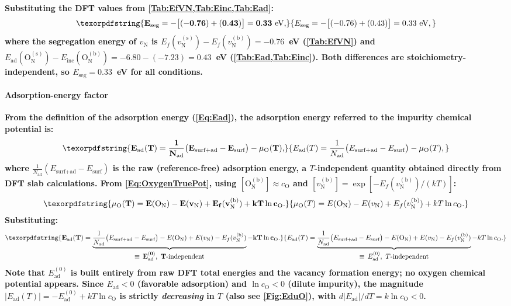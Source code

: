 \documentclass[preprint,12pt,sort&compress]{elsarticle}
\newcommand{\?}{\stackrel{?}{=}}
\providecommand{\DIFaddtex}[1]{{\bf #1}} %
\providecommand{\DIFadd}[1]{\texorpdfstring{\DIFaddtex{#1}}{#1}} %
\begin{document}

\DIFadd{Substituting the DFT values from \cref{Tab:EfVN,Tab:Einc,Tab:Ead}:
}\begin{equation}
\DIFadd{E_\text{seg} = -\bigl[(-0.76) + (0.43)\bigr] = 0.33~\text{eV},
\label{Eq:App:EsegValue}
}\end{equation}
\DIFadd{where the segregation energy of $v_\text{N}$ is $E_f(v_\text{N}^{(\text{s})}) - E_f(v_\text{N}^{(\text{b})}) = -0.76$~eV (\cref{Tab:EfVN}) and $E_\text{ad}(\text{O}_\text{N}^{(\text{s})}) - E_\text{inc}(\text{O}_\text{N}^{(\text{b})}) = -6.80 - (-7.23) = 0.43$~eV (\cref{Tab:Ead,Tab:Einc}). Both differences are stoichiometry-independent, so $E_\text{seg} = 0.33$~eV for all conditions.
}

\paragraph{\DIFadd{Adsorption-energy factor}} \DIFadd{From the definition of the adsorption energy (\cref{Eq:Ead}), the adsorption energy referred to the impurity chemical potential is:
}\begin{equation}
\DIFadd{E_\text{ad}(T) = \frac{1}{N_\text{ad}}\bigl(E_\text{surf+ad} - E_\text{surf}\bigr) - \mu_\text{O}(T),
}\end{equation}
\DIFadd{where $\frac{1}{N_\text{ad}}(E_\text{surf+ad} - E_\text{surf})$ is the raw (reference-free) adsorption energy, a $T$-independent quantity obtained directly from DFT slab calculations. From \cref{Eq:OxygenTruePot}, using $[\text{O}_\text{N}^{(\text{b})}] \approx c_\text{O}$ and $[v_\text{N}^{(\text{b})}] = \exp[-E_f(v_\text{N}^{(\text{b})})/(kT)]$:
}\begin{equation}
\DIFadd{\mu_\text{O}(T) = E(\text{O}_\text{N}) - E(v_\text{N}) + E_f(v_\text{N}^{(\text{b})}) + kT\ln c_\text{O}.
\label{Eq:App:muOimp}
}\end{equation}
\DIFadd{Substituting:
}\begin{equation}
\DIFadd{E_\text{ad}(T) = \underbrace{\frac{1}{N_\text{ad}}\bigl(E_\text{surf+ad} - E_\text{surf}\bigr) - E(\text{O}_\text{N}) + E(v_\text{N}) - E_f(v_\text{N}^{(\text{b})})}_{\displaystyle\equiv\,E_\text{ad}^{(0)},\ T\text{-independent}} - kT \ln c_\text{O}.
\label{Eq:App:EadImpExplicit}
}\end{equation}
\DIFadd{Note that $E_\text{ad}^{(0)}$ is built entirely from raw DFT total energies and the vacancy formation energy; no oxygen chemical potential appears. Since $E_\text{ad} < 0$ (favorable adsorption) and $\ln c_\text{O} < 0$ (dilute impurity), the magnitude $|E_\text{ad}(T)| = -E_\text{ad}^{(0)} + kT\ln c_\text{O}$ is strictly \emph{decreasing} in $T$ (also see \cref{Fig:EduO}), with $d|E_\text{ad}|/dT = k\ln c_\text{O} < 0$.
}
\end{document}
